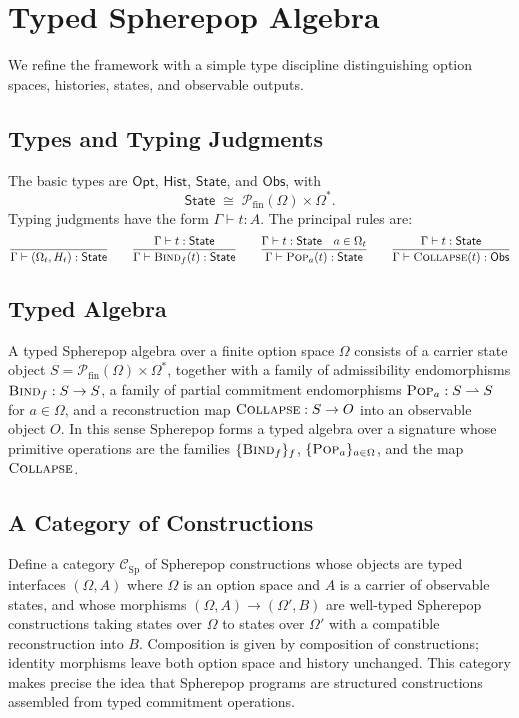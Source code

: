 \documentclass[12pt]{article}
\newcommand{\Pop}{\operatorname{\textsc{Pop}}}
\newcommand{\Bind}{\operatorname{\textsc{Bind}}}
\newcommand{\Collapse}{\operatorname{\textsc{Collapse}}}
\newcommand{\Option}{\Omega}
\begin{document}
\section{Typed Spherepop Algebra}
\label{app:typed}

We refine the framework with a simple type discipline distinguishing option spaces, histories, states, and observable outputs.

\subsection{Types and Typing Judgments}

The basic types are $\mathsf{Opt}$, $\mathsf{Hist}$, $\mathsf{State}$, and $\mathsf{Obs}$, with
\[
\mathsf{State} \;\cong\; \mathcal{P}_{\mathrm{fin}}(\Option) \times \Option^*.
\]
Typing judgments have the form $\Gamma \vdash t : A$. The principal rules are:
\[
\frac{}{\Gamma \vdash (\Option_t,H_t) : \mathsf{State}} \qquad
\frac{\Gamma \vdash t : \mathsf{State}}{\Gamma \vdash \Bind_f(t) : \mathsf{State}} \qquad
\frac{\Gamma \vdash t : \mathsf{State} \quad a \in \Option_t}{\Gamma \vdash \Pop_a(t) : \mathsf{State}} \qquad
\frac{\Gamma \vdash t : \mathsf{State}}{\Gamma \vdash \Collapse(t) : \mathsf{Obs}}
\]

\subsection{Typed Algebra}

A typed Spherepop algebra over a finite option space $\Option$ consists of a carrier state object $S = \mathcal{P}_{\mathrm{fin}}(\Option)\times \Option^*$, together with a family of admissibility endomorphisms $\Bind_f : S \to S$, a family of partial commitment endomorphisms $\Pop_a : S \rightharpoonup S$ for $a \in \Option$, and a reconstruction map $\Collapse : S \to O$ into an observable object $O$. In this sense Spherepop forms a typed algebra over a signature whose primitive operations are the families $\{\Bind_f\}_f$, $\{\Pop_a\}_{a\in\Option}$, and the map $\Collapse$.

\subsection{A Category of Constructions}

Define a category $\mathcal{C}_{\mathrm{Sp}}$ of Spherepop constructions whose objects are typed interfaces $(\Option, A)$ where $\Option$ is an option space and $A$ is a carrier of observable states, and whose morphisms $(\Option,A) \to (\Option',B)$ are well-typed Spherepop constructions taking states over $\Option$ to states over $\Option'$ with a compatible reconstruction into $B$. Composition is given by composition of constructions; identity morphisms leave both option space and history unchanged. This category makes precise the idea that Spherepop programs are structured constructions assembled from typed commitment operations.
\end{document}
